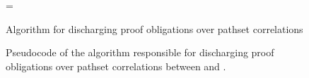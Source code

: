 \begin{figure}[t!]
\begin{algorithm}[H]
\begin{footnotesize}
\DontPrintSemicolon
\everypar={\nl}
\SetAlgoLined
{}
\end{footnotesize}
\caption{Algorithm for discharging proof obligations over pathset correlations}
\end{algorithm}
\caption{\label{algo:provepathset}Pseudocode of the algorithm responsible for discharging proof obligations over pathset correlations between \sprog{} and \cprog{}.}
\end{figure}